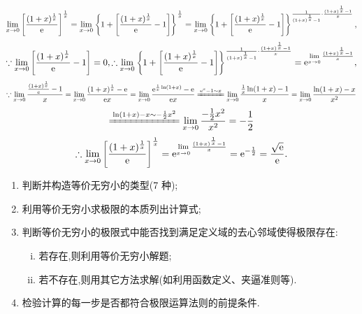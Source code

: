\solve $\displaystyle \lim_{x \to 0}\left[ \frac{(1+x)^{\frac{1}{x}}}{{\rm{e}}}\right]^{\frac{1}{x}}=\lim_{x \to 0}\left\lbrace1+\left[\frac{(1+x)^{\frac{1}{x}}}{{\rm{e}}}-1\right]\right\rbrace^{\frac 1x}=\lim_{x \to 0}\left\lbrace1+\left[\frac{(1+x)^{\frac{1}{x}}}{{\rm{e}}}-1\right]\right\rbrace^{ \frac{1}{(1+x)^{\frac 1x}-1}\cdot \frac{(1+x)^{\frac 1x}-1}{x}},$
\[
\because \lim\limits_{x \to 0}\left[\frac{(1+x)^{\frac{1}{x}}}{{\rm{e}}}-1\right]=0,\therefore \lim_{x \to 0}\left\lbrace1+\left[\frac{(1+x)^{\frac{1}{x}}}{{\rm{e}}}-1\right]\right\rbrace^{ \frac{1}{(1+x)^{\frac 1x}-1}\cdot \frac{(1+x)^{\frac 1x}-1}{x}}={\rm{e}}^{\lim\limits_{x\to 0}\frac{(1+x)^\frac 1x-1}{x}},
\]
\[
\because \lim\limits_{x\to 0}\frac{\frac{(1+x)^\frac 1x}{\e}-1}{x}=\lim\limits_{x\to 0}\frac{(1+x)^\frac 1x-\e}{\e x}=\lim\limits_{x \to 0}\frac{\e^{\frac{1}{x}\ln(1+x)}-\e}{\e x}\xlongequal[]{\e^x-1 \sim x} \lim\limits_{x \to 0}\frac{\frac{1}{x}\ln(1+x)-1}{x}=\lim_{x \to 0}\frac{\ln (1+x)-x}{x^2}
\]
\[
\xlongequal[]{\ln(1+x)-x\sim-\frac{1}{2}x^2} \lim\limits_{x \to 0}\frac{-\frac{1}{2}x^2}{x^2}=-\frac{1}{2}
\]
\[
\therefore \lim_{x \to 0}\left[ \frac{(1+x)^{\frac{1}{x}}}{{\rm{e}}}\right]^{\frac{1}{x}}={\rm{e}}^{\lim\limits_{x\to 0}\frac{(1+x)^\frac 1x-1}{x}}={\rm{e}}^{-\frac{1}{2}}=\frac{\sqrt{{\rm{e}}}}{{\rm{e}}}.
\]

\inference[等价无穷小求极限]\sj
\begin{enumerate}
	\item 判断并构造等价无穷小的类型(7 种);
	\item 利用等价无穷小求极限的本质列出计算式;
	\item 判断等价无穷小的极限式中能否找到满足定义域的去心邻域使得极限存在:
	\begin{enumerate}[(i)]
		\item 若存在,则利用等价无穷小解题;
		\item 若不存在,则用其它方法求解(如利用函数定义、夹逼准则等).
	\end{enumerate}
	\item 检验计算的每一步是否都符合极限运算法则的前提条件.
\end{enumerate}
\vspace*{-2em}

